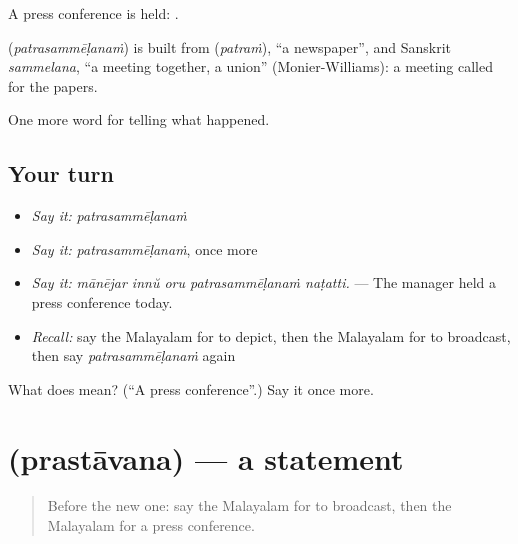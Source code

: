 A press conference is held:  .

\begin{cousinweb}
\textbf{} (\emph{patrasammēḷanaṁ}) is built from  (\emph{patraṁ}), \textquotedblleft{}a newspaper\textquotedblright{}, and Sanskrit \emph{sammelana}, \textquotedblleft{}a meeting together, a union\textquotedblright{} (Monier-Williams): a meeting called for the papers.
\end{cousinweb}

\begin{grammarlens}[title={What you've built}]
One more word for telling what happened.
\end{grammarlens}

\subsection*{Your turn}
\begin{itemize}
\raggedright
  \item \emph{Say it:} \emph{patrasammēḷanaṁ}
  \item \emph{Say it:} \emph{patrasammēḷanaṁ}, once more
  \item \emph{Say it:} \emph{mānējar innŭ oru patrasammēḷanaṁ naṭatti.} — The manager held a press conference today.
  \item \emph{Recall:} say the Malayalam for to depict, then the Malayalam for to broadcast, then say \emph{patrasammēḷanaṁ} again
\end{itemize}

\begin{tcolorbox}[breakable,colback=teal!4,colframe=teal!35!black,title={Before you move on}]
What does  mean? (\textquotedblleft{}A press conference\textquotedblright{}.) Say it once more.
\end{tcolorbox}
\section[\texorpdfstring{\ml{പ്രസ്താവന} (prastāvana)}{പ്രസ്താവന (prastāvana)}]{ (prastāvana) — a statement}

\label{lesson:ML-C352-prastavana}



\begin{quote}
Before the new one: say the Malayalam for to broadcast, then the Malayalam for a press conference.
\end{quote}

